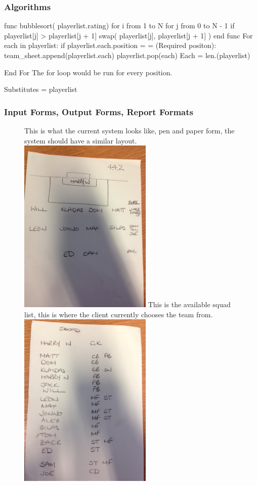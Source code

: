 \subsubsection{Algorithms}

func bubblesort( playerlist.rating)
    for i from 1 to N
        for j from 0 to N - 1
           if playerlist[j] > playerlist[j + 1]
              swap( playerlist[j], playerlist[j + 1] )
end func
For each in playerlist:
	if playerlist.each.position = = (Required positon):
		team_sheet.append(playerlist.each)
		playerlist.pop(each)
		Each = len.(playerlist)
		
	
End For
The for loop would be run for every position.

Substitutes =  playerlist 

\subsubsection{Input Forms, Output Forms, Report Formats}
\begin{figure}[H]
	This is what the current system looks like, pen and paper form, the system should have a similar layout.
	\includegraphics{formation}
	This is the available squad list, this is where the client currently chooses the team from. 
	\includegraphics{squad}
\end{figure}

